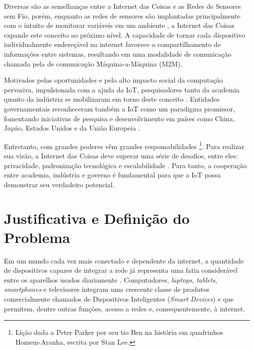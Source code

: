 \documentclass[twoside,english,brazilian]{UNISINOSmonografia}
\begin{document}
	Diversas são as semelhanças entre a Internet das Coisas e as Redes de 
	Sensores sem Fio, porém, enquanto as redes de sensores  
	são implantadas principalmente com o intuito de monitorar variáveis em um 
	ambiente \cite{Sakthidharan2012}, a Internet das Coisas expande este 
	conceito ao próximo nível. 
	A capacidade de tornar cada dispositivo individualmente endereçável na 
	internet favorece o compartilhamento de informações entre sistemas, 
	resultando em uma modalidade de comunicação chamada pela 
	 de comunicação Máquina-a-Máquina (M2M).
	
	Motivados pelas oportunidades e pelo alto impacto social da computação 
	pervasiva, impulsionada com a ajuda da IoT, pesquisadores tanto da 
	academia quanto da indústria se mobilizaram em torno deste conceito 
	\cite{Atzori2010b}. 
	Entidades governamentais reconheceram também a IoT como um paradigma 
	promissor, fomentando iniciativas de pesquisa e desenvolvimento em países 
	como China, Japão, Estados Unidos e da União Europeia 
	\cite{Sundmaeker2010}.
	
	Entretanto, com grandes poderes vêm grandes responsabilidades
	\footnote{Lição dada a Peter Parker por seu tio Ben na história em 
	quadrinhos Homem-Aranha, escrita por Stan Lee.}. 
	Para realizar sua visão, a Internet das Coisas deve superar uma série de 
	desafios, entre eles: privacidade, padronização tecnológica e 
	escalabilidade \cite{Coetzee2011}. 
	Para tanto, a cooperação entre academia, indústria e governo é fundamental 
	para que a IoT possa demonstrar seu verdadeiro potencial.
	

\section{Justificativa e Definição do Problema}

	Em um mundo cada vez mais conectado e dependente da internet, a quantidade 
	de dispositivos capazes de integrar a rede já representa uma fatia 
	considerável entre os aparelhos usados diariamente \cite{Accenture2012}.
	Computadores, \textit{laptops}, \textit{tablets}, \textit{smartphones} e 
	televisores integram uma crescente classe de produtos comercialmente 
	chamados de Dispositivos Inteligentes (\textit{Smart Devices}) e que 
	permitem, dentre outras funções, acesso a redes e, consequentemente, à 
	internet.
	
\end{document}
